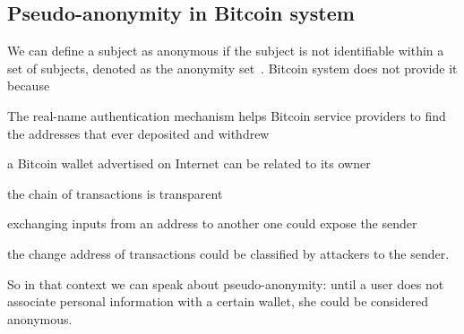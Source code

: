 \subsection{Pseudo-anonymity in Bitcoin system}
We can define a subject as anonymous if the subject is not identifiable
within a set of subjects, denoted as the anonymity
set~\cite{terminology}. Bitcoin system does not provide it
because~\cite{deanon}
\begin{enumerate*}[label=\roman*),itemjoin={,\quad}]
\item The real-name authentication mechanism helps Bitcoin service
providers to find the addresses that ever deposited and withdrew
\item a Bitcoin wallet advertised on Internet can be related to its
owner
\item the chain of transactions is transparent
\item exchanging inputs from an address to another one could expose the
sender
\item the change address of transactions could be classified by
attackers to the sender.
\end{enumerate*}
So in that context we can speak about pseudo-anonymity: until a user
does not associate personal information with a certain wallet, she
could be considered anonymous.
